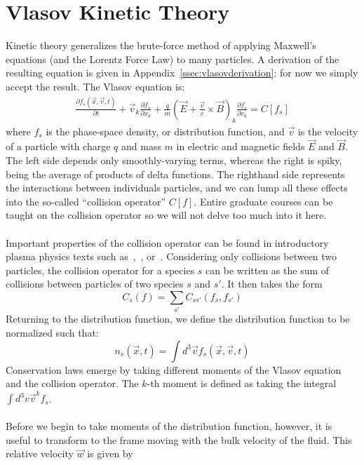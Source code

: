 \section{Vlasov Kinetic Theory} \label{sec:vlasov}
Kinetic theory generalizes the brute-force method of applying Maxwell's equations (and the Lorentz Force Law) to many particles. A derivation of the resulting equation is given in Appendix~\ref{ssec:vlasovderivation}: for now we simply accept the result. The Vlasov equation is:
\begin{align}
  \frac{\partial f_s(\vec x,\vec v,t)}{\partial t}+\vec v_k\frac{\partial f_s}{\partial x_k}+\frac qm (\vec E+\frac{\vec v}{c}\times\vec B)_k\frac{\partial f_s}{\partial v_k}=C[f_s] \label{eq:vlasov}
\end{align}
where $f_s$ is the phase-space density, or distribution function, and $\vec v$ is the velocity of a particle with charge $q$ and mass $m$ in electric and magnetic fields $\vec E$ and $\vec B$. The left side depends only smoothly-varying terms, whereas the right is spiky, being the average of products of delta functions. The righthand side represents the interactions between individuals particles, and we can lump all these effects into the so-called ``collision operator'' $C[f]$. Entire graduate courses can be taught on the collision operator so we will not delve too much into it here.\\
\\
Important properties of the collision operator can be found in introductory plasma physics texts such as~\citet{Nicholson1983},~\citet{Hazeltine2004}, or~\citet{KunzLecture1}. Considering only collisions between two particles, the collision operator for a species $s$ can be written as the sum of collisions between particles of two species $s$ and $s'$. It then takes the form
\begin{equation}
  C_s(f)=\sum_{s'}C_{ss'}(f_s,f_{s'})
\end{equation}
Returning to the distribution function, we define the distribution function to be normalized such that:
\begin{equation}
  n_s(\vec x,t)=\int d^3\vec v f_s(\vec x,\vec v, t)\label{eq:nnorm}
\end{equation}
Conservation laws emerge by taking different moments of the Vlasov equation and the collision operator. The $k$-th moment is defined as taking the integral $\int d^3v \vec v^k f_s$.\\
\\
Before we begin to take moments of the distribution function, however, it is useful to transform to the frame moving with the bulk velocity of the fluid. This relative velocity $\vec w$ is given by
